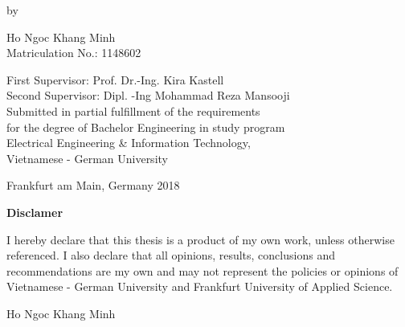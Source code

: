 \begin{titlepage}
\begin{center}
        \vspace*{0.5cm}

        \normalsize
        by \\

        \vspace*{0.5cm}

        \Large
        Ho Ngoc Khang Minh \\
      	\normalsize
      	\vspace{0.2cm}
		Matriculation No.: 1148602
		
        \vspace*{1.5cm}
        \large
       	First Supervisor: Prof. Dr.-Ing. Kira Kastell \\
       	Second Supervisor: Dipl. -Ing Mohammad Reza Mansooji \\
       	\vspace{1.7cm}
        \normalsize
        Submitted in partial fulfillment of the requirements\\
        for the degree of Bachelor Engineering in study program\\
        Electrical Engineering \& Information Technology,\\
        Vietnamese - German University

        \vspace*{3.0cm}
		
        Frankfurt am Main, Germany 2018 \\
	
        
        \end{center}
\end{titlepage}

\pagestyle{plain}
\setcounter{page}{2}
\cleardoublepage
 


  
  {
  	\begin{center}
  		\Large
  		\bf Disclamer
  	\end{center}
  	{
  		\par
  		I hereby declare that this thesis is a product of my own work, unless otherwise
  		referenced. I also declare that all opinions, results, conclusions and recommendations are
  		my own and may not represent the policies or opinions of Vietnamese - German University and Frankfurt University of Applied Science. \par
  	}
  	\vspace{3cm}
  	\hspace{11cm}
  	Ho Ngoc Khang Minh
  	\cleardoublepage
  }	

